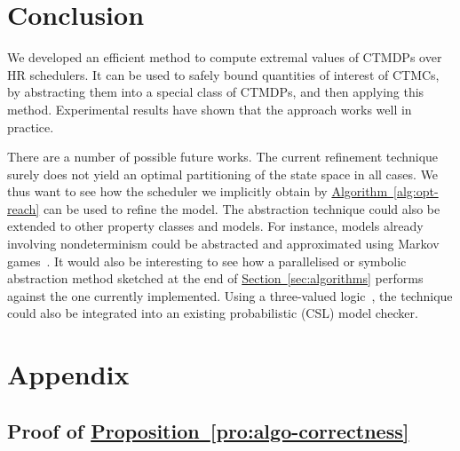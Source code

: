 \documentclass[10pt,twocolumn]{article}
\newcommand{\refsec}[1]{\texorpdfstring{\hyperref[sec:#1]{Section~\ref*{sec:#1}}}{Section~\ref*{sec:#1}}}
\newcommand{\refpro}[1]{\texorpdfstring{\hyperref[pro:#1]{Proposition~\ref*{pro:#1}}}{Proposition~\ref*{pro:#1}}}
\newcommand{\refalg}[1]{\texorpdfstring{\hyperref[alg:#1]{Algorithm~\ref*{alg:#1}}}{Algorithm~\ref*{alg:#1}}}
\begin{document}
\section{Conclusion}
\label{sec:conclusion}
\noindent We developed an efficient method to compute extremal values of CTMDPs over HR schedulers.
It can be used to safely bound quantities of interest of CTMCs, by abstracting them into a special class of CTMDPs, and then applying this method.
Experimental results have shown that the approach works well in practice.

There are a number of possible future works.
The current refinement technique surely does not yield an optimal partitioning of the state space in all cases.
We thus want to see how the scheduler we implicitly obtain by \refalg{opt-reach} can be used to refine the model.
The abstraction technique could also be extended to other property classes and models.
For instance, models already involving nondeterminism could be abstracted and approximated using Markov games~\cite{BrazdilFKKK09,RabeS10,RabeS11}.
It would also be interesting to see how a parallelised or symbolic abstraction method sketched at the end of \refsec{algorithms} performs against the one currently implemented.
Using a three-valued logic~\cite{Klink10}, the technique could also be integrated into an existing probabilistic (CSL) model checker.

\balance

\clearpage

\section*{Appendix}

\label{appendices}

\subsection*{Proof of \refpro{algo-correctness}}
\label{apx:algo-correctness}
\end{document}
